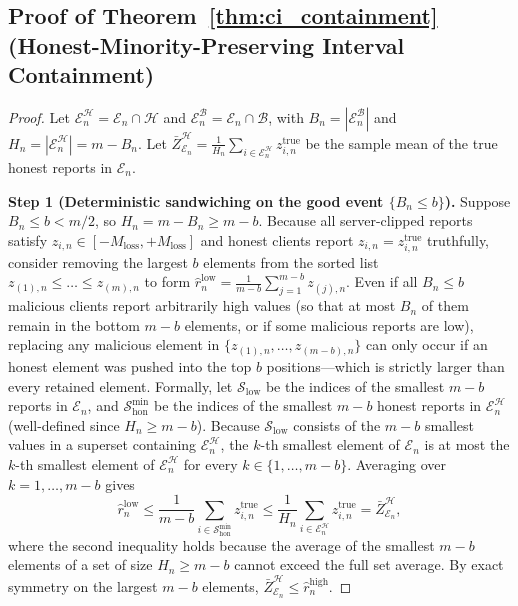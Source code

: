 \subsection{Proof of Theorem~\ref{thm:ci_containment} (Honest-Minority-Preserving Interval Containment)}
\begin{proof}
Let $\mathcal{E}_n^{\mathcal{H}} = \mathcal{E}_n \cap \mathcal{H}$ and $\mathcal{E}_n^{\mathcal{B}} = \mathcal{E}_n \cap \mathcal{B}$, with $B_n = |\mathcal{E}_n^{\mathcal{B}}|$ and $H_n = |\mathcal{E}_n^{\mathcal{H}}| = m - B_n$. Let $\bar{Z}_{\mathcal{E}_n}^{\mathcal{H}} = \frac{1}{H_n}\sum_{i\in\mathcal{E}_n^{\mathcal{H}}} z_{i,n}^{\mathrm{true}}$ be the sample mean of the true honest reports in $\mathcal{E}_n$.

\textbf{Step 1 (Deterministic sandwiching on the good event $\{B_n \le b\}$).}
Suppose $B_n \le b < m/2$, so $H_n = m - B_n \ge m - b$. Because all server-clipped reports satisfy $z_{i,n} \in [-M_{\mathrm{loss}}, +M_{\mathrm{loss}}]$ and honest clients report $z_{i,n} = z_{i,n}^{\mathrm{true}}$ truthfully, consider removing the largest $b$ elements from the sorted list $z_{(1),n} \le \dots \le z_{(m),n}$ to form $\hat{r}_n^{\mathrm{low}} = \frac{1}{m-b}\sum_{j=1}^{m-b} z_{(j),n}$. Even if all $B_n \le b$ malicious clients report arbitrarily high values (so that at most $B_n$ of them remain in the bottom $m-b$ elements, or if some malicious reports are low), replacing any malicious element in $\{z_{(1),n}, \dots, z_{(m-b),n}\}$ can only occur if an honest element was pushed into the top $b$ positions—which is strictly larger than every retained element. Formally, let $\mathcal{S}_{\mathrm{low}}$ be the indices of the smallest $m-b$ reports in $\mathcal{E}_n$, and $\mathcal{S}_{\mathrm{hon}}^{\mathrm{min}}$ be the indices of the smallest $m-b$ honest reports in $\mathcal{E}_n^{\mathcal{H}}$ (well-defined since $H_n \ge m-b$). Because $\mathcal{S}_{\mathrm{low}}$ consists of the $m-b$ smallest values in a superset containing $\mathcal{E}_n^{\mathcal{H}}$, the $k$-th smallest element of $\mathcal{E}_n$ is at most the $k$-th smallest element of $\mathcal{E}_n^{\mathcal{H}}$ for every $k \in \{1, \dots, m-b\}$. Averaging over $k = 1, \dots, m-b$ gives
\[
\hat{r}_n^{\mathrm{low}}
\le \frac{1}{m-b}\sum_{i\in\mathcal{S}_{\mathrm{hon}}^{\mathrm{min}}} z_{i,n}^{\mathrm{true}}
\le \frac{1}{H_n}\sum_{i\in\mathcal{E}_n^{\mathcal{H}}} z_{i,n}^{\mathrm{true}}
= \bar{Z}_{\mathcal{E}_n}^{\mathcal{H}},
\]
where the second inequality holds because the average of the smallest $m-b$ elements of a set of size $H_n \ge m-b$ cannot exceed the full set average. By exact symmetry on the largest $m-b$ elements, $\bar{Z}_{\mathcal{E}_n}^{\mathcal{H}} \le \hat{r}_n^{\mathrm{high}}$.


\end{proof}
